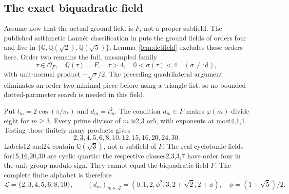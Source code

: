 \documentclass[11pt]{article}
\newcommand{\Q}{\mathbb Q}
\begin{document}
\subsection{The exact biquadratic field}
Assume now that the actual ground field is $F$, not a proper subfield.
The published arithmetic Lann\'er classification in
\cite[Section3.1, Figure1 and formula(4)]{Nikulin} puts the ground
fields of orders four and five in $\{\Q,\Q(\sqrt2),\Q(\sqrt5)\}$.
Lemma~\ref{lem:detfield} excludes those orders here. Order two remains
the full, unsampled family
\[
 \tau\in\mathcal O_F,\quad \Q(\tau)=F,\quad
 \tau>4,\quad 0<\sigma(\tau)<4\quad(\sigma\ne\mathrm{id}),
\]
with unit-normal product $-\sqrt\tau/2$. The preceding quadrilateral
argument eliminates an order-two minimal piece before using a triangle
list, so no bounded dotted-parameter search is needed in this field.

Put $t_m=2\cos(\pi/m)$ and $d_m=t_m^2$.
The condition $d_m\in F$ makes $\varphi(m)$ divide eight for $m\ge3$.
Every prime divisor of $m$ is2,3 or5, with exponents at most4,1,1.
Testing those finitely many products gives
\[
 2,3,4,5,6,8,10,12,15,16,20,24,30.
\]
Labels12 and24 contain $\Q(\sqrt3)$, not a subfield of $F$.
The real cyclotomic fields for15,16,20,30 are cyclic quartic:
the respective classes2,3,3,7 have order four in the unit group
modulo sign. They cannot equal the biquadratic field $F$.
The complete finite alphabet is therefore
\[
 \mathcal L=\{2,3,4,5,6,8,10\},\qquad
 (d_m)_{m\in\mathcal L}=(0,1,2,\phi^2,3,2+\sqrt2,2+\phi),
 \quad\phi=(1+\sqrt5)/2.
\]
\end{document}
